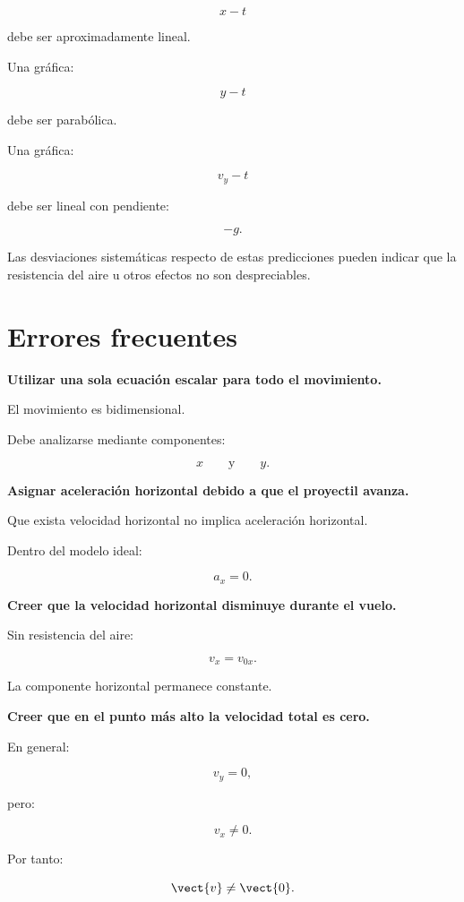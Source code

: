 \[
x-t
\]

debe ser aproximadamente lineal.

Una gráfica:

\[
y-t
\]

debe ser parabólica.

Una gráfica:

\[
v_y-t
\]

debe ser lineal con pendiente:

\[
-g.
\]

\begin{interpretacion}
Las desviaciones sistemáticas respecto de estas predicciones pueden indicar que
la resistencia del aire u otros efectos no son despreciables.
\end{interpretacion}


\section{Errores frecuentes}

\begin{errorfrecuente}
\textbf{Utilizar una sola ecuación escalar para todo el movimiento.}

El movimiento es bidimensional.

Debe analizarse mediante componentes:

\[
x
\qquad\text{y}\qquad
y.
\]
\end{errorfrecuente}


\begin{errorfrecuente}
\textbf{Asignar aceleración horizontal debido a que el proyectil avanza.}

Que exista velocidad horizontal no implica aceleración horizontal.

Dentro del modelo ideal:

\[
a_x=0.
\]
\end{errorfrecuente}


\begin{errorfrecuente}
\textbf{Creer que la velocidad horizontal disminuye durante el vuelo.}

Sin resistencia del aire:

\[
v_x=v_{0x}.
\]

La componente horizontal permanece constante.
\end{errorfrecuente}


\begin{errorfrecuente}
\textbf{Creer que en el punto más alto la velocidad total es cero.}

En general:

\[
v_y=0,
\]

pero:

\[
v_x\neq0.
\]

Por tanto:

\[
\vect{v}\neq\vect{0}.
\]
\end{errorfrecuente}


